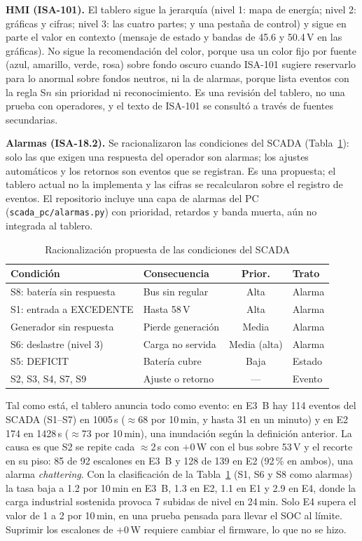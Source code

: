 \documentclass[conference]{IEEEtran}
\begin{document}
\textbf{HMI (ISA-101).} El tablero sigue la jerarquía (nivel 1: mapa de energía; nivel 2: gráficas y cifras; nivel 3: las cuatro partes; y una pestaña de control) y sigue en parte el valor en contexto (mensaje de estado y bandas de 45.6 y 50.4\,V en las gráficas). No sigue la recomendación del color, porque usa un color fijo por fuente (azul, amarillo, verde, rosa) sobre fondo oscuro cuando ISA-101 sugiere reservarlo para lo anormal sobre fondos neutros, ni la de alarmas, porque lista eventos con la regla S$n$ sin prioridad ni reconocimiento. Es una revisión del tablero, no una prueba con operadores, y el texto de ISA-101 se consultó a través de fuentes secundarias.

\textbf{Alarmas (ISA-18.2).} Se racionalizaron las condiciones del SCADA (Tabla~\ref{tab:isa182}): solo las que exigen una respuesta del operador son alarmas; los ajustes automáticos y los retornos son eventos que se registran. Es una propuesta; el tablero actual no la implementa y las cifras se recalcularon sobre el registro de eventos. El repositorio incluye una capa de alarmas del PC (\texttt{scada\_pc/alarmas.py}) con prioridad, retardos y banda muerta, aún no integrada al tablero.

\begin{table}[!t]
\caption{Racionalización propuesta de las condiciones del SCADA}
\label{tab:isa182}
\centering
\scriptsize\setlength{\tabcolsep}{2.5pt}
\begin{tabular}{|p{2.5cm}|p{1.45cm}|c|p{0.95cm}|}
\hline
\textbf{Condición} & \textbf{Consecuencia} & \textbf{Prior.} & \textbf{Trato} \\ \hline
S8: batería sin respuesta & Bus sin regular & Alta & Alarma \\ \hline
S1: entrada a EXCEDENTE & Hasta 58\,V & Alta & Alarma \\ \hline
Generador sin respuesta & Pierde generación & Media & Alarma \\ \hline
S6: deslastre (nivel 3) & Carga no servida & Media (alta) & Alarma \\ \hline
S5: DEFICIT & Batería cubre & Baja & Estado \\ \hline
S2, S3, S4, S7, S9 & Ajuste o retorno & --- & Evento \\ \hline
\end{tabular}
\end{table}

Tal como está, el tablero anuncia todo como evento: en E3~B hay 114 eventos del SCADA (S1--S7) en 1005\,s ($\approx$68 por 10\,min, y hasta 31 en un minuto) y en E2 174 en 1428\,s ($\approx$73 por 10\,min), una inundación según la definición anterior. La causa es que S2 se repite cada $\approx$2\,s con $+0$\,W con el bus sobre 53\,V y el recorte en su piso: 85 de 92 escalones en E3~B y 128 de 139 en E2 (92\,\% en ambos), una alarma \emph{chattering}. Con la clasificación de la Tabla~\ref{tab:isa182} (S1, S6 y S8 como alarmas) la tasa baja a 1.2 por 10\,min en E3~B, 1.3 en E2, 1.1 en E1 y 2.9 en E4, donde la carga industrial sostenida provoca 7 subidas de nivel en 24\,min. Solo E4 supera el valor de 1 a 2 por 10\,min, en una prueba pensada para llevar el SOC al límite. Suprimir los escalones de $+0$\,W requiere cambiar el firmware, lo que no se hizo.
\end{document}
